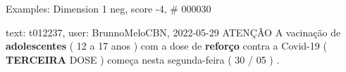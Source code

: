 \begin{frame}{Examples: Dimension 1 neg, score -4, \# 000030}
\footnotesize
\begin{alertblock}{text: t012237, user: BrunnoMeloCBN, 2022-05-29}
ATENÇÃO A vacinação de \textbf{adolescentes} ( 12 a 17 anos ) com a dose de 
\textbf{reforço} contra a Covid-19 ( \textbf{TERCEIRA} DOSE ) começa nesta 
segunda-feira ( 30 / 05 ) . 
\end{alertblock}
\end{frame}
